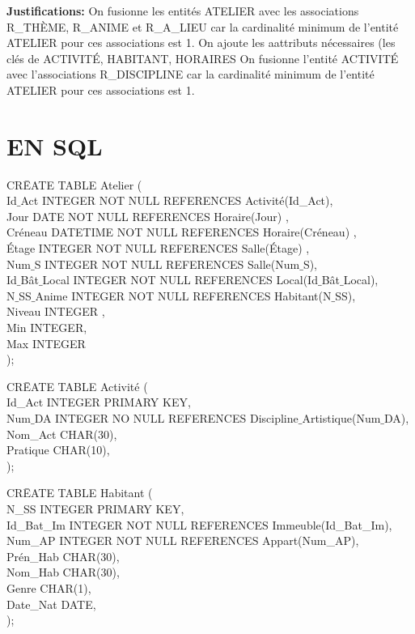 \documentclass[a4paper,10.5pt]{report}
\begin{document}
	\textbf{Justifications: }
	On fusionne les entités ATELIER avec les associations R\_THÈME, R\_ANIME et R\_A\_LIEU car la cardinalité minimum de l'entité ATELIER pour ces associations est 1. On ajoute les aattributs nécessaires (les clés de ACTIVITÉ, HABITANT, HORAIRES
	On fusionne l'entité ACTIVITÉ avec l'associations R\_DISCIPLINE car la cardinalité minimum de l'entité ATELIER pour ces associations est 1.
	\newpage
    \section{EN SQL}

		\begin{tabbing}
			CR\=EATE TABLE Atelier (\\
			\> Id$\_$Act INTEGER NOT NULL REFERENCES Activité(Id\_Act),\\
            \> Jour DATE NOT NULL REFERENCES Horaire(Jour) ,\\
            \> Créneau DATETIME NOT NULL REFERENCES Horaire(Créneau) ,\\
            \> Étage INTEGER NOT NULL REFERENCES Salle(Étage) ,\\
			\> Num$\_$S INTEGER NOT NULL REFERENCES Salle(Num$\_$S),\\
			\> Id$\_$Bât$\_$Local INTEGER NOT NULL REFERENCES Local(Id$\_$Bât$\_$Local),\\
			\> N$\_$SS$\_$Anime  INTEGER NOT NULL REFERENCES Habitant(N$\_$SS),\\
			\> Niveau INTEGER ,\\
			\> Min INTEGER,\\
			\> Max INTEGER\\);
		\end{tabbing}

		\begin{tabbing}
			CR\=EATE TABLE Activité (\\
			\> Id\_Act INTEGER PRIMARY KEY,\\
			\> Num$\_$DA INTEGER NO NULL REFERENCES Discipline$\_$Artistique(Num$\_$DA),\\
			\> Nom\_Act CHAR(30),\\
			\> Pratique CHAR(10),\\);
		\end{tabbing}

		\begin{tabbing}
			CR\=EATE TABLE Habitant (\\
			\> N\_SS INTEGER PRIMARY KEY,\\
			\> Id\_Bat\_Im INTEGER NOT NULL REFERENCES Immeuble(Id\_Bat\_Im),\\
			\> Num\_AP INTEGER NOT NULL REFERENCES Appart(Num\_AP),\\
			\> Prén\_Hab CHAR(30),\\
			\> Nom\_Hab CHAR(30),\\
			\> Genre CHAR(1),\\
			\> Date\_Nat DATE,\\);
		\end{tabbing}
\end{document}
